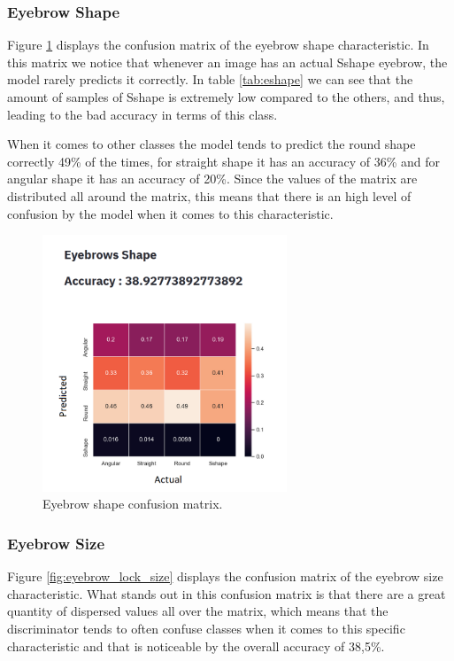 \documentclass[12pt,a4paper,oneside]{memoir}
\begin{document}
\subsubsection{Eyebrow Shape}
Figure \ref{fig:eybrows_lock_shape} displays the confusion matrix of the eyebrow shape characteristic. In this matrix we notice that whenever an image has an actual Sshape eyebrow, the model rarely predicts it correctly. In table \ref{tab:eshape} we can see that the amount of samples of Sshape is extremely low compared to the others, and thus, leading to the bad accuracy in terms of this class.

\par

When it comes to other classes the model tends to predict the round shape correctly 49\% of the times, for straight shape it has an accuracy of 36\% and for angular shape it has an accuracy of 20\%. Since the values of the matrix are distributed all around the matrix, this means that there is an high level of confusion by the model when it comes to this characteristic.

\begin{figure}[H]
\centering
\includegraphics[width=0.65\textwidth]{images/eyebrows_lock_shape.png}
\caption{Eyebrow shape confusion matrix.}
\centering
\label{fig:eybrows_lock_shape}
\end{figure}





\subsubsection{Eyebrow Size}
Figure \ref{fig:eyebrow_lock_size} displays the confusion matrix of the eyebrow size characteristic. What stands out in this confusion matrix is that there are a great quantity of dispersed values all over the matrix, which means that the discriminator tends to often confuse classes when it comes to this specific characteristic and that is noticeable by the overall accuracy of 38,5\%.
\end{document}
